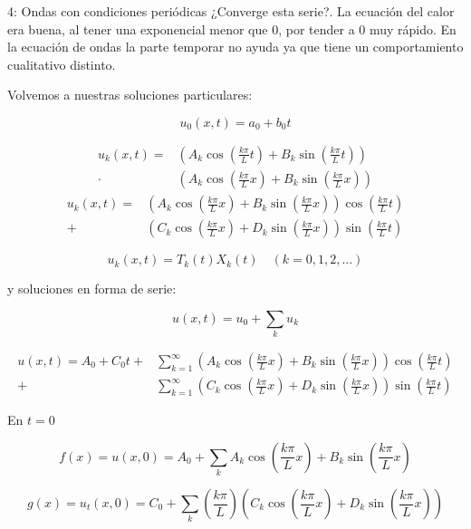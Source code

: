 \begin{example}{4: Ondas con condiciones periódicas}
			¿Converge esta serie?. La ecuación del calor era buena, al tener una exponencial menor que 0, por tender a 0 muy rápido. En la ecuación de ondas la parte temporar no ayuda ya que tiene un comportamiento cualitativo distinto.

			Volvemos a nuestras soluciones particulares:

			\[u_0(x,t) = a_0 + b_0t\]


			\begin{align*}
			u_k(x,t) = &\left(A_k \cos \left( \frac{k \pi}{L} t \right) + B_k \sin \left( \frac{k \pi}{L} t \right) \right) \\
			\cdot &\left(A_k \cos \left( \frac{k \pi}{L} x \right) + B_k \sin \left( \frac{k \pi}{L} x \right) \right)
			\end{align*}
			\begin{align*}
			u_k(x,t) = &\left(A_k \cos \left( \frac{k \pi}{L} x \right) + B_k \sin \left( \frac{k \pi}{L} x \right) \right) \cos \left( \frac{k \pi}{L} t \right)\\
			+ &\left(C_k \cos \left( \frac{k \pi}{L} x \right) + D_k \sin \left( \frac{k \pi}{L} x \right) \right) \sin \left( \frac{k \pi}{L} t \right)
			\end{align*}




			\[u_k(x,t) = T_k(t) X_k(t) \quad (k=0,1,2,…)\]


			y soluciones en forma de serie:

			\[ u(x,t) = u_0 + \sum_k u_k \]

			\begin{align*}
				u(x,t) = A_0 + C_0 t + &\sum^{\infty}_{k=1} \left(A_k \cos \left( \frac{k \pi}{L} x \right) + B_k \sin \left( \frac{k \pi}{L} x \right) \right) \cos \left( \frac{k \pi}{L} t \right)\\
				+ &\sum^{\infty}_{k=1} \left(C_k \cos \left( \frac{k \pi}{L} x \right) + D_k \sin \left( \frac{k \pi}{L} x \right) \right) \sin \left( \frac{k \pi}{L} t \right)
			\end{align*}

			En $t = 0$

			\[f(x) = u(x,0) = A_0 + \sum_{k} A_k \cos \left( \frac{k \pi}{L} x \right) + B_k \sin \left( \frac{k \pi}{L} x \right) \]

			\[g(x) = u_t (x,0) = C_0 + \sum_{k} \left(\frac{k \pi}{L}\right) \left( C_k \cos \left( \frac{k \pi}{L} x \right) + D_k \sin \left( \frac{k \pi}{L} x \right)\right) \]


		\end{example}

